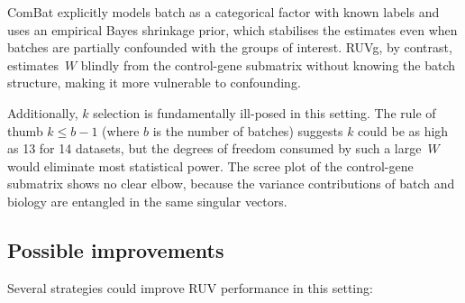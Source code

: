 \documentclass[11pt,a4paper]{article}
\begin{document}
ComBat explicitly models batch as a categorical factor with known
labels and uses an empirical Bayes shrinkage prior, which stabilises
the estimates even when batches are partially confounded with the
groups of interest.  RUVg, by contrast, estimates~$W$ blindly from
the control-gene submatrix without knowing the batch structure,
making it more vulnerable to confounding.

Additionally, $k$ selection is fundamentally ill-posed in this
setting.  The rule of thumb $k \le b - 1$ (where $b$ is the number
of batches) suggests $k$ could be as high as 13 for 14 datasets, but
the degrees of freedom consumed by such a large~$W$ would eliminate
most statistical power.  The scree plot of the control-gene
submatrix shows no clear elbow, because the variance contributions of
batch and biology are entangled in the same singular vectors.


\subsection{Possible improvements}

Several strategies could improve RUV performance in this setting:
\end{document}
